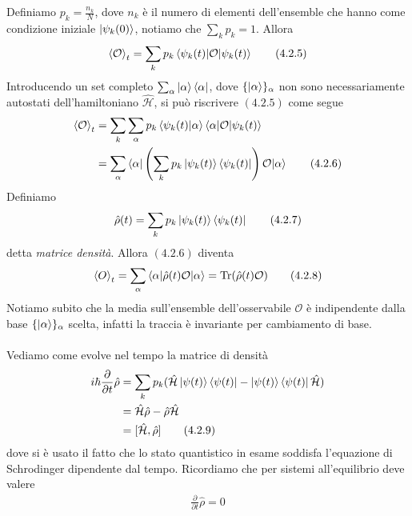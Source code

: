 \documentclass{article}
\begin{document}
Definiamo $p_k = \frac{n_k}{N}$, dove $n_k$ è il numero di elementi dell'ensemble che hanno come condizione iniziale $\ket{\psi_k(0)}$, notiamo che $\sum_k p_k = 1$. Allora 
\begin{align}
    \braket{\mathcal{O}}_t = \sum_k p_k\braket{\psi_k(t)|\mathcal{O}|\psi_k(t)} \tag{4.2.5}
\end{align}
Introducendo un set completo $\sum_\alpha \ket{\alpha}\bra{\alpha}$, dove $\{\ket{\alpha}\}_{\alpha}$ non sono necessariamente autostati dell'hamiltoniano $\hat{\mathcal{H}}$, si può riscrivere $(4.2.5)$ come segue 
\begin{align}
    \braket{\mathcal{O}}_t &= \sum_k\sum_\alpha p_k\braket{\psi_k(t)|\alpha}\braket{\alpha|\mathcal{O}|\psi_k(t)} \notag \\
    &= \sum_\alpha \braket{\alpha|\left(\sum_k p_k \ket{\psi_k(t)}\bra{\psi_k(t)}\right)\mathcal{O}|\alpha} \tag{4.2.6}
\end{align}
Definiamo
\begin{align}
    \hat{\rho}(t) = \sum_k p_k\ket{\psi_k(t)}\bra{\psi_k(t)} \tag{4.2.7}
\end{align}
detta \textit{matrice densità}. Allora $(4.2.6)$ diventa 
\begin{align}
    \braket{O}_t = \sum_\alpha \braket{\alpha|\hat{\rho}(t)\mathcal{O}|\alpha} = \mathrm{Tr}(\hat{\rho}(t)\mathcal{O}) \tag{4.2.8}
\end{align}
Notiamo subito che la media sull'ensemble dell'osservabile $\mathcal{O}$ è indipendente dalla base $\{\ket{\alpha}\}_\alpha$ scelta, infatti la traccia è invariante per cambiamento di base. \\ \\
Vediamo come evolve nel tempo la matrice di densità
\begin{align}
    i\hbar\frac{\partial}{\partial t}\hat{\rho} &= \sum_k p_k(\hat{\mathcal{H}}\ket{\psi(t)}\bra{\psi(t)} - \ket{\psi(t)}\bra{\psi(t)}\hat{\mathcal{H}}) \notag \\
    &= \hat{\mathcal{H}}\hat{\rho} - \hat{\rho}\hat{\mathcal{H}} \notag \\
    &= [\hat{\mathcal{H}}, \hat{\rho}] \tag{4.2.9}
\end{align}
dove si è usato il fatto che lo stato quantistico in esame soddisfa l'equazione di Schrodinger dipendente dal tempo. Ricordiamo che per sistemi all'equilibrio deve valere
\begin{align}
    \frac{\partial}{\partial t}\hat{\rho} = 0 \tag{4.2.10}
\end{align}
\end{document}
